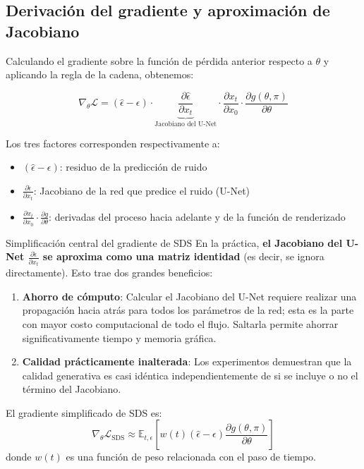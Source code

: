 \documentclass[a4paper]{article}
\begin{document}
\subsection{Derivación del gradiente y aproximación de Jacobiano}

Calculando el gradiente sobre la función de pérdida anterior respecto a $\theta$ y aplicando la regla de la cadena, obtenemos:

$$
\nabla_\theta \mathcal{L} = (\hat{\epsilon} - \epsilon) \cdot \underbrace{\frac{\partial \hat{\epsilon}}{\partial x_t}}_{\text{Jacobiano del U-Net}} \cdot \frac{\partial x_t}{\partial x_0} \cdot \frac{\partial g(\theta, \pi)}{\partial \theta}
$$

Los tres factores corresponden respectivamente a:
\begin{itemize}
    \item $(\hat{\epsilon} - \epsilon)$: residuo de la predicción de ruido
    \item $\frac{\partial \hat{\epsilon}}{\partial x_t}$: Jacobiano de la red que predice el ruido (U-Net)
    \item $\frac{\partial x_t}{\partial x_0} \cdot \frac{\partial g}{\partial \theta}$: derivadas del proceso hacia adelante y de la función de renderizado
\end{itemize}

\begin{importantbox}{Simplificación central del gradiente de SDS}
En la práctica, \textbf{el Jacobiano del U-Net $\frac{\partial \hat{\epsilon}}{\partial x_t}$ se aproxima como una matriz identidad} (es decir, se ignora directamente). Esto trae dos grandes beneficios:

\begin{enumerate}
    \item \textbf{Ahorro de cómputo}: Calcular el Jacobiano del U-Net requiere realizar una propagación hacia atrás para todos los parámetros de la red; esta es la parte con mayor costo computacional de todo el flujo. Saltarla permite ahorrar significativamente tiempo y memoria gráfica.
    \item \textbf{Calidad prácticamente inalterada}: Los experimentos demuestran que la calidad generativa es casi idéntica independientemente de si se incluye o no el término del Jacobiano.
\end{enumerate}

El gradiente simplificado de SDS es:
$$
\nabla_\theta \mathcal{L}_{\text{SDS}} \approx \mathbb{E}_{t,\epsilon}\left[w(t)(\hat{\epsilon} - \epsilon) \frac{\partial g(\theta, \pi)}{\partial \theta}\right]
$$
donde $w(t)$ es una función de peso relacionada con el paso de tiempo.
\end{importantbox}
\end{document}
